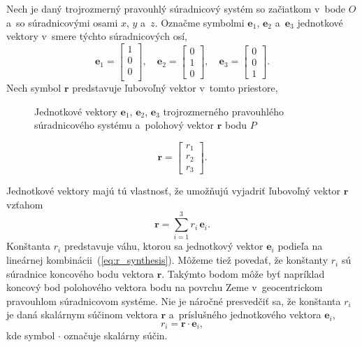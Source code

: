 \documentclass[a4paper, 12pt]{book}
\let\vec\mathbf
\begin{document}
Nech je daný trojrozmerný pravouhlý súradnicový systém so začiatkom v~bode $O$
a~so súradnicovými osami $x$, $y$ a~$z$.  Označme symbolmi $\vec e_1$, $\vec
e_2$ a~$\vec e_3$ jednotkové vektory v~smere týchto súradnicových osí,
%
\begin{equation}
\vec e_1 =
\begin{bmatrix}
1\\
0\\
0\\
\end{bmatrix}
{,} \quad
%
\vec e_2 =
\begin{bmatrix}
0\\
1\\
0
\end{bmatrix}
%
{,}\quad
%
\vec e_3 =
\begin{bmatrix}
0\\
0\\
1
\end{bmatrix}
{.}
\end{equation}
%
Nech symbol $\vec r$ predstavuje ľubovoľný vektor v~tomto priestore,

\begin{figure}
\centering

\caption{Jednotkové vektory $\vec e_1$, $\vec e_2$, $\vec e_3$ trojrozmerného
pravouhlého súradnicového systému a~polohový vektor $\vec r$ bodu $P$}
\label{fig:unit_vectors}
\end{figure}

\begin{equation}
\vec r =
\begin{bmatrix}
r_1\\
r_2\\
r_3
\end{bmatrix}
{.}
\end{equation}

Jednotkové vektory majú tú vlastnosť, že umožňujú vyjadriť ľubovoľný vektor
$\vec r$ vzťahom
%
\begin{equation}
\label{eq:r_synthesis}
\vec r = \sum_{i = 1}^3 r_i \, \vec e_i{.}
\end{equation}
%
Konštanta $r_i$ predstavuje váhu, ktorou sa jednotkový vektor $\vec e_i$
podieľa na lineárnej kombinácii~(\ref{eq:r_synthesis}).  Môžeme tiež povedať,
že konštanty $r_i$ sú súradnice koncového bodu vektora $\vec r$.  Takýmto bodom
môže byť napríklad koncový bod polohového vektora bodu na povrchu Zeme
v~geocentrickom pravouhlom súradnicovom systéme.  Nie je náročné presvedčiť sa,
že konštanta $r_i$ je daná skalárnym súčinom vektora $\vec r$ a~príslušného
jednotkového vektora $\vec e_i$,
%
\begin{equation}
\label{eq:r_analysis}
r_i = \vec r \cdot \vec e_i{,}
\end{equation}
%
kde symbol $\cdot$ označuje skalárny súčin.
\end{document}
